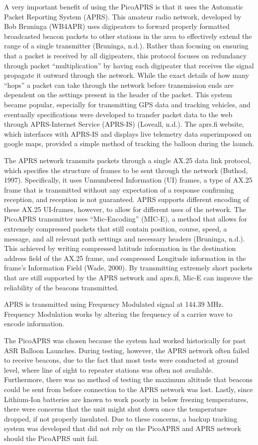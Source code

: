 \documentclass[12pt,]{article}
\begin{document}
A very important benefit of using the PicoAPRS is that it uses the
Automatic Packet Reporting System (APRS). This amateur radio network,
developed by Bob Bruninga (WB4APR) uses digipeaters to forward properly
formatted broadcasted beacon packets to other stations in the area to
effectively extend the range of a single transmitter (Bruninga, n.d.).
Rather than focusing on ensuring that a packet is received by all
digipeaters, this protocol focuses on redundancy through packet
``multiplication'' by having each digipeater that receives the signal
propagate it outward through the network. While the exact details of how
many ``hops'' a packet can take through the network before transmission
ends are dependent on the settings present in the header of the packet.
This system became popular, especially for transmitting GPS data and
tracking vehicles, and eventually specifications were developed to
transfer packet data to the web through APRS-Internet Service (APRS-IS)
(Loveall, n.d.). The aprs.fi website, which interfaces with APRS-IS and
displays live telemetry data superimposed on google maps, provided a
simple method of tracking the balloon during the launch.

The APRS network transmits packets through a single AX.25 data link
protocol, which specifies the structure of frames to be sent through the
network (Buthod, 1997). Specifically, it uses Unnumbered Information
(UI) frames, a type of AX.25 frame that is transmitted without any
expectation of a response confirming reception, and reception is not
guaranteed. APRS supports different encoding of these AX.25 UI-frames,
however, to allow for different uses of the network. The PicoAPRS
transmitter uses ``Mic-Encoding'' (MIC-E), a method that allows for
extremely compressed packets that still contain position, course, speed,
a message, and all relevant path settings and necessary headers
(Bruninga, n.d.). This achieved by writing compressed latitude
information in the destination address field of the AX.25 frame, and
compressed Longitude information in the frame's Information Field (Wade,
2000). By transmitting extremely short packets that are still supported
by the APRS network and aprs.fi, Mic-E can improve the reliability of
the beacons transmitted.

APRS is transmitted using Frequency Modulated signal at 144.39 MHz.
Frequency Modulation works by altering the frequency of a carrier wave
to encode information.

The PicoAPRS was chosen because the system had worked historically for
past ASR Balloon Launches. During testing, however, the APRS network
often failed to receive beacons, due to the fact that most tests were
conducted at ground level, where line of sight to repeater stations was
often not available. Furthermore, there was no method of testing the
maximum altitude that beacons could be sent from before connection to
the APRS network was lost. Lastly, since Lithium-Ion batteries are known
to work poorly in below freezing temperatures, there were concerns that
the unit might shut down once the temperature dropped, if not properly
insulated. Due to these concerns, a backup tracking system was developed
that did not rely on the PicoAPRS and APRS network should the PicoAPRS
unit fail.
\end{document}
